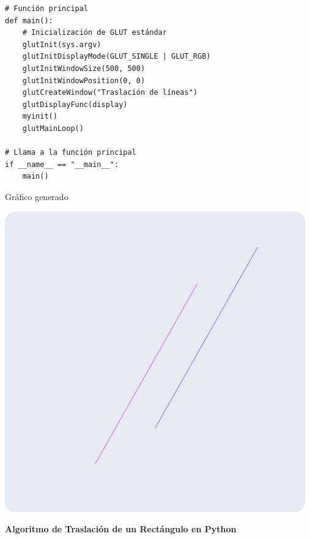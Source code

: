 \documentclass[a4paper]{article}
\begin{document}
\begin{center}
\begin{mycodebox}
\begin{lstlisting}
# Función principal
def main():
    # Inicialización de GLUT estándar
    glutInit(sys.argv)
    glutInitDisplayMode(GLUT_SINGLE | GLUT_RGB)
    glutInitWindowSize(500, 500)  
    glutInitWindowPosition(0, 0)  
    glutCreateWindow("Traslación de líneas") 
    glutDisplayFunc(display) 
    myinit() 
    glutMainLoop() 

# Llama a la función principal
if __name__ == "__main__":
    main()
\end{lstlisting}
\end{mycodebox}
\end{center}
Gráfico generado 
\begin{center}
\includegraphics[width=13cm]{src/1.png}
\end{center}
\newpage
\Large{\textbf{Algoritmo de Traslación de un Rectángulo en Python}}\\[-0.4cm]
\end{document}
